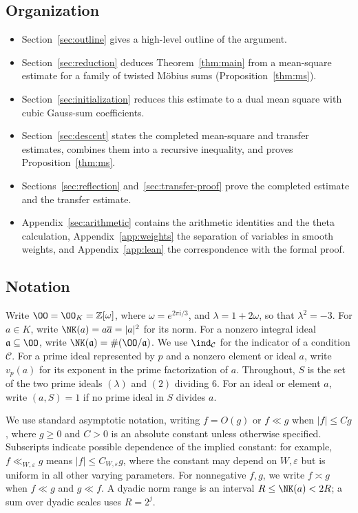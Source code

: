\subsection{Organization}
\begin{itemize}
\item Section~\ref{sec:outline} gives a high-level outline of the argument.
\item Section~\ref{sec:reduction} deduces Theorem~\ref{thm:main} from a mean-square estimate
for a family of twisted Möbius sums (Proposition~\ref{thm:ms}).
\item Section~\ref{sec:initialization} reduces this estimate to a dual mean square with cubic
Gauss-sum coefficients.
\item Section~\ref{sec:descent} states the completed mean-square and transfer estimates,
combines them into a recursive inequality, and proves Proposition~\ref{thm:ms}.
\item Sections~\ref{sec:reflection} and~\ref{sec:transfer-proof} prove the completed estimate
and the transfer estimate.
\item Appendix~\ref{sec:arithmetic} contains the arithmetic identities and the theta
calculation, Appendix~\ref{app:weights} the separation of variables in smooth weights, and
Appendix~\ref{app:lean} the correspondence with the formal proof.
\end{itemize}

\subsection{Notation}

Write $\OO=\OO_K=\mathbb Z[\omega]$, where $\omega=e^{2\pi\mathrm i/3}$, and
$\lambda=1+2\omega$, so that $\lambda^2=-3$.
For $a\in K$, write $\NK(a)=a\overline a=|a|^2$ for its norm.
For a nonzero integral ideal $\mathfrak a\subseteq\OO$, write
$\NK(\mathfrak a)=\#(\OO/\mathfrak a)$.
We use $\ind_{\mathcal C}$ for the indicator of a condition $\mathcal C$.
For a prime ideal represented by $p$ and a nonzero element or ideal $a$,
write $v_p(a)$ for its exponent in the prime factorization of $a$.
Throughout, $S$ is the set of the two prime ideals $(\lambda)$ and $(2)$ dividing $6$.
For an ideal or element $a$, write $(a,S)=1$ if no prime ideal in $S$ divides $a$.

We use standard asymptotic notation, writing $f=O(g)$ or $f\ll g$ when $|f|\le Cg$, where $g\ge0$ and $C>0$ is an absolute constant unless otherwise specified. Subscripts indicate possible dependence of the implied constant: for example, $f\ll_{W,\varepsilon}g$ means $|f|\le C_{W,\varepsilon}g$, where the constant may depend on $W,\varepsilon$ but is uniform in all other varying parameters. For nonnegative $f,g$, we write $f\asymp g$ when $f\ll g$ and $g\ll f$.
 A dyadic norm range is an interval $R\le\NK(a)<2R$; a sum over dyadic scales uses $R=2^j$.

